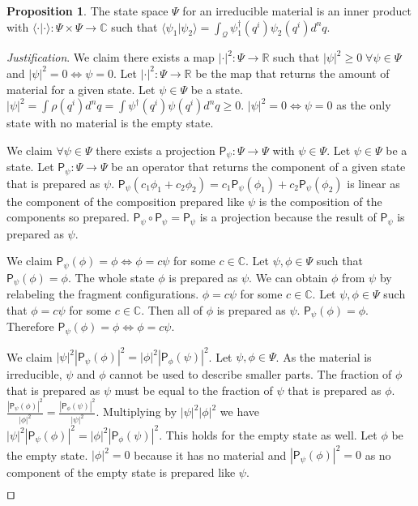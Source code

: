 \documentclass[smallextended]{svjour3}
\numberwithin{equation}{section}
\newenvironment{justification}{\emph{Justification}.}{\hfill\(\qed\)}
\theoremstyle{definition}
\newtheorem{prop}[equation]{Proposition}
\newenvironment{justification}{\emph{Justification}.}{\qed}
\begin{document}
\begin{prop}\label{prop:inner_product}
	The state space $\Psi$ for an irreducible material is an inner product with $\langle \cdot |\cdot \rangle : \Psi \times \Psi \rightarrow \mathbb{C}$ such that $\langle \psi_1 | \psi_2 \rangle = \int_\mathcal{Q} \psi_1^\dagger (q^i) \psi_2(q^i) d^nq$.
\end{prop}
\begin{justification}
	We claim there exists a map $| \cdot | ^2 : \Psi \rightarrow \mathbb{R}$ such that $|\psi|^2 \ge 0 \; \forall \psi \in \Psi$ and $|\psi|^2 = 0 \Leftrightarrow \psi = 0$. Let $| \cdot | ^2 : \Psi \rightarrow \mathbb{R}$ be the map that returns the amount of material for a given state. Let $\psi \in \Psi$ be a state. $|\psi|^2 = \int \rho(q^i) d^nq = \int \psi^\dagger(q^i) \psi(q^i) d^nq \ge 0$. $|\psi|^2 = 0 \Leftrightarrow \psi = 0$ as the only state with no material is the empty state.
	
	We claim $\forall \psi \in \Psi$ there exists a projection $\mathsf{P}_\psi : \Psi \rightarrow \Psi$ with $\psi \in \Psi$. Let $\psi \in \Psi$ be a state. Let $\mathsf{P}_\psi : \Psi \rightarrow \Psi$ be an operator that returns the component of a given state that is prepared as $\psi$. $\mathsf{P}_{\psi}(c_1 \phi_1 + c_2 \phi_2) = c_1 \mathsf{P}_{\psi}(\phi_1) + c_2 \mathsf{P}_{\psi}(\phi_2)$ is linear as the component of the composition prepared like $\psi$ is the composition of the components so prepared. $\mathsf{P}_\psi \circ \mathsf{P}_\psi = \mathsf{P}_\psi$ is a projection because the result of $\mathsf{P}_\psi$  is prepared as $\psi$. 
	
	We claim $\mathsf{P}_{\psi} (\phi) = \phi \Leftrightarrow \phi = c \psi$ for some $c \in \mathbb{C}$. Let $\psi, \phi \in \Psi$ such that $\mathsf{P}_{\psi} (\phi) = \phi$. The whole state $\phi$ is prepared as $\psi$. We can obtain $\phi$ from $\psi$ by relabeling the fragment configurations. $\phi = c \psi$ for some $c \in \mathbb{C}$. Let $\psi, \phi \in \Psi$ such that $\phi = c \psi$ for some $c \in \mathbb{C}$. Then all of $\phi$ is prepared as $\psi$. $\mathsf{P}_{\psi} (\phi) = \phi$. Therefore $\mathsf{P}_{\psi} (\phi) = \phi \Leftrightarrow \phi = c \psi$.
	
	We claim $|\psi|^2|\mathsf{P}_{\psi} (\phi)|^2=|\phi|^2|\mathsf{P}_{\phi} (\psi)|^2$. Let $\psi, \phi \in \Psi$. As the material is irreducible, $\psi$ and $\phi$ cannot be used to describe smaller parts. The fraction of $\phi$ that is prepared as $\psi$ must be equal to the fraction of $\psi$ that is prepared as $\phi$. $\frac{|\mathsf{P}_{\psi} (\phi)|^2}{|\phi|^2}=\frac{|\mathsf{P}_{\phi} (\psi)|^2}{|\psi|^2}$. Multiplying by $|\psi|^2|\phi|^2$ we have $|\psi|^2|\mathsf{P}_{\psi} (\phi)|^2=|\phi|^2|\mathsf{P}_{\phi} (\psi)|^2$. This holds for the empty state as well. Let $\phi$ be the empty state. $|\phi|^2=0$ because it has no material and $|\mathsf{P}_{\psi} (\phi)|^2 = 0$ as no component of the empty state is prepared like $\psi$.
	

\end{justification}
\end{document}

